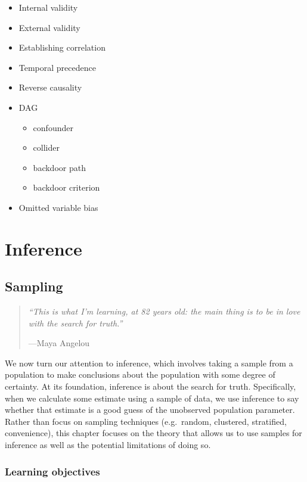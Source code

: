 \documentclass[
]{book}
\providecommand{\tightlist}{%
  \setlength{\itemsep}{0pt}\setlength{\parskip}{0pt}}
\begin{document}
\begin{itemize}
\tightlist
\item
  Internal validity
\item
  External validity
\item
  Establishing correlation
\item
  Temporal precedence
\item
  Reverse causality
\item
  DAG

  \begin{itemize}
  \tightlist
  \item
    confounder
  \item
    collider
  \item
    backdoor path
  \item
    backdoor criterion
  \end{itemize}
\item
  Omitted variable bias
\end{itemize}

\hypertarget{part-inference}{%
\part{Inference}\label{part-inference}}

\hypertarget{sampling}{%
\chapter{Sampling}\label{sampling}}

\begin{quote}
\emph{``This is what I'm learning, at 82 years old: the main thing is to be in love with the search for truth.''}

---Maya Angelou
\end{quote}

We now turn our attention to inference, which involves taking a sample from a population to make conclusions about the population with some degree of certainty. At its foundation, inference is about the search for truth. Specifically, when we calculate some estimate using a sample of data, we use inference to say whether that estimate is a good guess of the unobserved population parameter. Rather than focus on sampling techniques (e.g.~random, clustered, stratified, convenience), this chapter focuses on the theory that allows us to use samples for inference as well as the potential limitations of doing so.

\hypertarget{lo10}{%
\section{Learning objectives}\label{lo10}}
\end{document}
